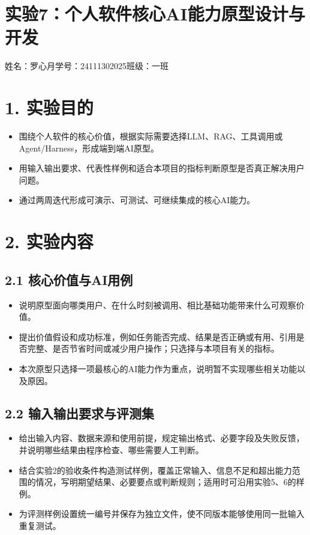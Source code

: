 \documentclass[UTF8,12pt,a4paper]{ctexart}
\def\thelstlisting{7-\arabic{lstlisting}}
\begin{document}
\renewcommand{\thelstlisting}{7-\arabic{lstlisting}}

\section*{实验7：个人软件核心AI能力原型设计与开发}

\begin{center}
姓名：罗心月\qquad 学号：24111302025\qquad 班级：一班
\end{center}

\section*{1. 实验目的}

\begin{itemize}
  \item 围绕个人软件的核心价值，根据实际需要选择LLM、RAG、工具调用或Agent/Harness，形成端到端AI原型。
  \item 用输入输出要求、代表性样例和适合本项目的指标判断原型是否真正解决用户问题。
  \item 通过两周迭代形成可演示、可测试、可继续集成的核心AI能力。
\end{itemize}

\section*{2. 实验内容}

\subsection*{2.1 核心价值与AI用例}

\begin{itemize}
  \item 说明原型面向哪类用户、在什么时刻被调用、相比基础功能带来什么可观察价值。
  \item 提出价值假设和成功标准，例如任务能否完成、结果是否正确或有用、引用是否完整、是否节省时间或减少用户操作；只选择与本项目有关的指标。
  \item 本次原型只选择一项最核心的AI能力作为重点，说明暂不实现哪些相关功能以及原因。
\end{itemize}

\subsection*{2.2 输入输出要求与评测集}

\begin{itemize}
  \item 给出输入内容、数据来源和使用前提，规定输出格式、必要字段及失败反馈，并说明哪些结果由程序检查、哪些需要人工判断。
  \item 结合实验2的验收条件构造测试样例，覆盖正常输入、信息不足和超出能力范围的情况，写明期望结果、必要要点或判断规则；适用时可沿用实验5、6的样例。
  \item 为评测样例设置统一编号并保存为独立文件，使不同版本能够使用同一批输入重复测试。
\end{itemize}
\end{document}
